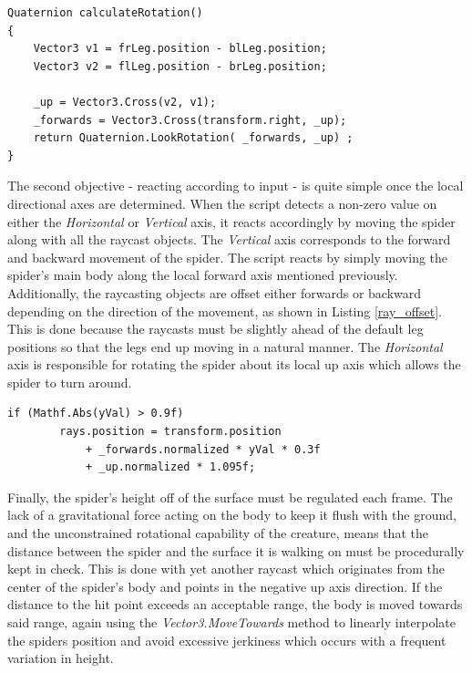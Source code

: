 \begin{lstlisting}[basicstyle=\linespread{0.9}\footnotesize\ttfamily, numbers=none,frame=single,
caption={Calculating the spider's rotation.
\textit{IKSpiderMovement.cs}},captionpos=t, label=rotation, language={[Sharp]c},
float=tp]
Quaternion calculateRotation()
{
    Vector3 v1 = frLeg.position - blLeg.position;
    Vector3 v2 = flLeg.position - brLeg.position;
    
    _up = Vector3.Cross(v2, v1);
    _forwards = Vector3.Cross(transform.right, _up);
    return Quaternion.LookRotation( _forwards, _up) ;
}
\end{lstlisting}


The second objective - reacting according to input - is quite simple once the
local directional axes are determined. When the script detects a non-zero value
on either the \textit{Horizontal} or \textit{Vertical} axis, it reacts
accordingly by moving the spider along with all the raycast objects. The
\textit{Vertical} axis corresponds to the forward and backward movement of the
spider. The script reacts by simply moving the spider's main body along the
local forward axis mentioned previously. Additionally, the raycasting objects
are offset either forwards or backward depending on the direction of the
movement, as shown in Listing \ref{ray_offset}. This is done because the
raycasts must be slightly ahead of the default leg positions so that the legs
end up moving in a natural manner. The \textit{Horizontal} axis is responsible
for rotating the spider about its local up axis which allows the spider to turn
around. 

\begin{lstlisting}[basicstyle=\linespread{0.9}\footnotesize\ttfamily, numbers=none,frame=single,
caption={The raycasts which scan the terrain for leg placement positions are
offset in the direction in which the spider is walking. The \textit{yVal}
variable is the value of the \textit{Vertical} axis input. \textit{IKSpiderMovement.cs}},captionpos=t,
label=ray_offset, language={[Sharp]c}, float=tp]
    if (Mathf.Abs(yVal) > 0.9f)
        rays.position = transform.position
            + _forwards.normalized * yVal * 0.3f
            + _up.normalized * 1.095f;
\end{lstlisting}

Finally, the spider's height off of the surface must be regulated each frame.
The lack of a gravitational force acting on the body to keep it flush with the
ground, and the unconstrained rotational capability of the creature, means that
the distance between the spider and the surface it is walking on must be
procedurally kept in check. This is done with yet another raycast which
originates from the center of the spider's body and points in the negative up
axis direction. If the distance to the hit point exceeds an acceptable range,
the body is moved towards said range, again using the
\textit{Vector3.MoveTowards} method to linearly interpolate the spiders position
and avoid excessive jerkiness which occurs with a frequent variation in height. 



